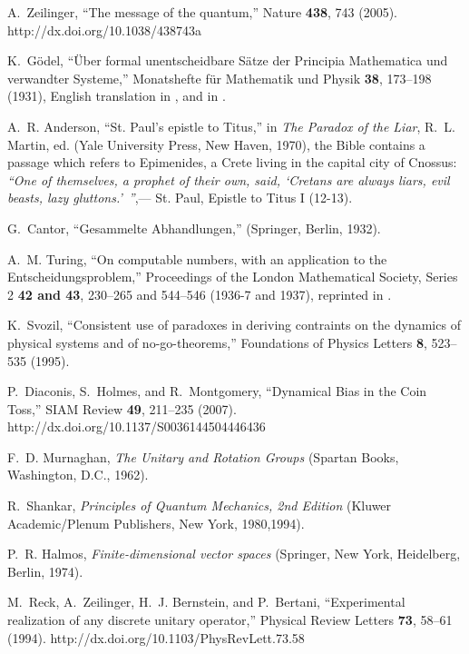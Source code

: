 \documentclass[prl,amsfonts,amsmath,showpacs,showkeys,preprint]{revtex4}
\begin{document}
\begin{thebibliography}{10}
A.~Zeilinger, \enquote{The message of the quantum,} Nature {\bf 438}, 743
  (2005).
\newline http://dx.doi.org/10.1038/438743a

K.~G{\"{o}}del, \enquote{{\"{U}}ber formal unentscheidbare {S\"{a}}tze der
  {P}rincipia {M}athematica und verwandter {S}ysteme,} Monatshefte f{\"{u}}r
  Mathematik und Physik {\bf 38}, 173--198 (1931), {E}nglish translation in
  \cite{godel-ges1}, and in \cite{davis}.

A.~R. Anderson, \enquote{St. {P}aul's epistle to {T}itus,} in {\em The Paradox
  of the Liar\/}, R.~L. Martin, ed.  (Yale University Press, New Haven, 1970),
  the Bible contains a passage which refers to Epimenides, a Crete living in
  the capital city of Cnossus: {\it ``One of themselves, a prophet of their
  own, said, `Cretans are always liars, evil beasts, lazy gluttons.'~''},---
  St. Paul, Epistle to Titus I (12-13).

G.~Cantor, \enquote{{G}esammelte {A}bhandlungen,}  (Springer, Berlin, 1932).

A.~M. Turing, \enquote{On computable numbers, with an application to the
  {E}ntscheidungsproblem,} Proceedings of the London Mathematical Society,
  Series 2 {\bf 42 and 43}, 230--265 and 544--546 (1936-7 and 1937), reprinted
  in \cite{davis}.

K.~Svozil, \enquote{Consistent use of paradoxes in deriving contraints on the
  dynamics of physical systems and of no-go-theorems,} Foundations of Physics
  Letters {\bf 8}, 523--535 (1995).

P.~Diaconis, S.~Holmes, and R.~Montgomery, \enquote{Dynamical Bias in the Coin
  Toss,} SIAM Review {\bf 49}, 211--235 (2007).
\newline http://dx.doi.org/10.1137/S0036144504446436

F.~D. Murnaghan, {\em The Unitary and Rotation Groups\/} (Spartan Books,
  Washington, D.C., 1962).

R.~Shankar, {\em Principles of Quantum Mechanics, 2nd Edition\/} (Kluwer
  Academic/Plenum Publishers, New York, 1980,1994).

P.~R. Halmos, {\em Finite-dimensional vector spaces\/} (Springer, New York,
  Heidelberg, Berlin, 1974).

M.~Reck, A.~Zeilinger, H.~J. Bernstein, and P.~Bertani, \enquote{Experimental
  realization of any discrete unitary operator,} Physical Review Letters {\bf
  73}, 58--61 (1994).
\newline http://dx.doi.org/10.1103/PhysRevLett.73.58


\end{thebibliography}
\end{document}
